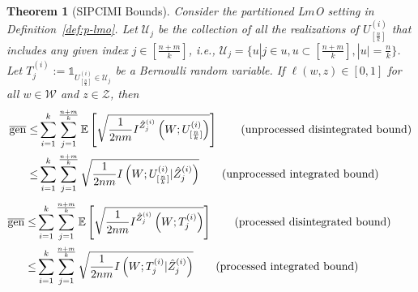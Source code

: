 \documentclass[onecolumn,romanappendices,10pt]{IEEEtran}
\newtheorem{theorem}{Theorem}
\newcommand{\Ucal}{{\mathcal U}}
\newcommand{\Wcal}{{\mathcal W}}
\newcommand{\Zcal}{{\mathcal Z}}
\newcommand{\EE}{{\mathbb{E}}}
\DeclareMathOperator{\gen}{\overline{gen}}
\begin{document}
	\begin{theorem}[SIPCIMI Bounds]\label{thm:SIPCIMI}
		Consider the partitioned L$m$O setting in Definition~\ref{def:p-lmo}. Let $\Ucal_j$ be the collection of all the realizations of $U^{(i)}_{[\frac{n}{k}]}$ that includes any given index $j \in [\frac{n+m}{k}]$, i.e., $\Ucal_j = \{u | j \in u, u \subset [\frac{n+m}{k}], |u| = \frac{n}{k} \}$. Let $T^{(i)}_j := \mathds{1}_{U^{(i)}_{[\frac{n}{k}]} \in \Ucal_j}$ be a Bernoulli random variable. If $\ell(w, z) \in [0, 1]$ for all $w \in \Wcal$ and $z \in \Zcal$, then
		\begin{subequations}
			\begin{align}
				\gen \leq& \sum_{i=1}^{k} \sum_{j=1}^{\frac{n+m}{k}} \EE \left[ \sqrt{\frac{1}{2nm} I^{\hat{Z}^{(i)}_j}\left( W; U^{(i)}_{[\frac{n}{k}]} \right)} \right] \qquad (\textnormal{unprocessed disintegrated bound}) \label{eq:dis-SIPCIMI} \\
				\leq& \sum_{i=1}^{k} \sum_{j=1}^{\frac{n+m}{k}} \sqrt{\frac{1}{2nm} I\left( W; U^{(i)}_{[\frac{n}{k}]} | \hat{Z}^{(i)}_j \right)} \qquad (\textnormal{unprocessed integrated bound}) \label{eq:SIPCIMI}
			\end{align}
		\end{subequations}
		\begin{subequations}
			\begin{align}		
				\gen \leq& \sum_{i=1}^{k} \sum_{j=1}^{\frac{n+m}{k}} \EE \left[ \sqrt{\frac{1}{2nm} I^{\hat{Z}^{(i)}_j}\left( W; T^{(i)}_j \right)} \right] \qquad (\textnormal{processed disintegrated bound}) \qquad \label{eq:p-dis-SIPCIMI} \\
				\leq& \sum_{i=1}^{k} \sum_{j=1}^{\frac{n+m}{k}} \sqrt{\frac{1}{2nm} I\left( W; T^{(i)}_j | \hat{Z}^{(i)}_j \right)} \qquad (\textnormal{processed integrated bound}) \label{eq:p-SIPCIMI} 
			\end{align}
		\end{subequations}
	\end{theorem}
	
\end{document}

